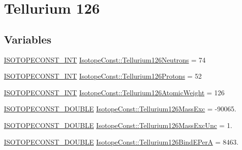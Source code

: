 \hypertarget{group___isotope_const-_tellurium-_te126}{}\section{Tellurium 126}
\label{group___isotope_const-_tellurium-_te126}
\subsection*{Variables}
\begin{DoxyCompactItemize}
\item 
\mbox{\hyperlink{group___isotope_const-_macros_ga5f18360b3e99483a35c32d789e62621c}{I\+S\+O\+T\+O\+P\+E\+C\+O\+N\+S\+T\+\_\+\+I\+NT}} \mbox{\hyperlink{group___isotope_const-_tellurium-_te126_ga0622fb5e9013878927250bd7e8a33ff6}{Isotope\+Const\+::\+Tellurium126\+Neutrons}} = 74
\item 
\mbox{\hyperlink{group___isotope_const-_macros_ga5f18360b3e99483a35c32d789e62621c}{I\+S\+O\+T\+O\+P\+E\+C\+O\+N\+S\+T\+\_\+\+I\+NT}} \mbox{\hyperlink{group___isotope_const-_tellurium-_te126_gab6f965e4f96cc9336cd9b12cab560a0f}{Isotope\+Const\+::\+Tellurium126\+Protons}} = 52
\item 
\mbox{\hyperlink{group___isotope_const-_macros_ga5f18360b3e99483a35c32d789e62621c}{I\+S\+O\+T\+O\+P\+E\+C\+O\+N\+S\+T\+\_\+\+I\+NT}} \mbox{\hyperlink{group___isotope_const-_tellurium-_te126_gaf6497a7cd9607f76f1c58f45d278cb8c}{Isotope\+Const\+::\+Tellurium126\+Atomic\+Weight}} = 126
\item 
\mbox{\hyperlink{group___isotope_const-_macros_ga8f45a7272ce02c0b4c65c44636ed719a}{I\+S\+O\+T\+O\+P\+E\+C\+O\+N\+S\+T\+\_\+\+D\+O\+U\+B\+LE}} \mbox{\hyperlink{group___isotope_const-_tellurium-_te126_ga92732a5d46a20e2b6881c68cf84e2899}{Isotope\+Const\+::\+Tellurium126\+Mass\+Exc}} = -\/90065.
\item 
\mbox{\hyperlink{group___isotope_const-_macros_ga8f45a7272ce02c0b4c65c44636ed719a}{I\+S\+O\+T\+O\+P\+E\+C\+O\+N\+S\+T\+\_\+\+D\+O\+U\+B\+LE}} \mbox{\hyperlink{group___isotope_const-_tellurium-_te126_gaf25f16b80900356cd90086479f779b06}{Isotope\+Const\+::\+Tellurium126\+Mass\+Exc\+Unc}} = 1.
\item 
\mbox{\hyperlink{group___isotope_const-_macros_ga8f45a7272ce02c0b4c65c44636ed719a}{I\+S\+O\+T\+O\+P\+E\+C\+O\+N\+S\+T\+\_\+\+D\+O\+U\+B\+LE}} \mbox{\hyperlink{group___isotope_const-_tellurium-_te126_ga4a7377e3067a2237496de3bc8e30189c}{Isotope\+Const\+::\+Tellurium126\+Bind\+E\+PerA}} = 8463.
\item 

\end{DoxyCompactItemize}
